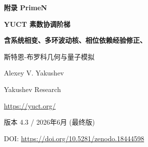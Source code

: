 \documentclass[11pt,a4paper]{article}
\newcommand{\kappac}{\kappa_c}
\newcommand{\Seven}{S_{\mathrm{even}}}
\begin{document}
	
	\begin{titlepage}
		\centering
		\vspace*{0cm}
		
		{\Huge\bfseries 附录 PrimeN\par}
		\vspace{0.5cm}
		{\Large\bfseries YUCT 素数协调阶梯\par}
		\vspace{0.3cm}
		{\Large\bfseries 含系统相变、多环波动核、相位依赖经验修正、\par
			斯特恩-布罗科几何与量子模拟\par}
		\vspace{1.0cm}
		
		{\large Alexey V. Yakushev\par}
		\vspace{0.3cm}
		{\normalsize Yakushev Research\par}
		{\normalsize \url{https://yuct.org/}\par}
		
		\vspace{0.5cm}
		{\normalsize 版本 4.3 / 2026年6月 (最终版)\par}
		\vspace{0.3cm}
		{\normalsize DOI: \url{https://doi.org/10.5281/zenodo.18444598}\par}
		
		\vfill
		
		\begin{abstract}
			\noindent
			我们建立了素数分布与 Yakushev 统一协调理论 (YUCT) 之间的严格联系。普适误差律 \(\varepsilon = \kappac \alpha K_{\mathrm{eff}}^{-\beta}\) (\(\beta=2/3\), \(\kappac=1/3\)) 支配着第 \(n\) 个素数 \(p_n\) 围绕经典 Rosser 近似的渐近涨落。从 YUCT 的代数环出发，我们推导出一个 \textbf{理论修正} \(p_n \approx R_n - \frac{\Seven}{2}\, n^{1-\beta}\,\ln n\)，该修正 \textbf{不含自由参数}，并提供了素数偏差平滑趋势的渐近精确描述（定理~4）。
			
			\textbf{本版本新内容：} 我们发现并数学推导了真空晶格的 \textbf{级联相变}，表现为第一环修正的符号反转，临界指数为 \(N_f = 80,\,96.5,\,113,\,\dots\)，步长 \(\Delta N = 16.5\)，直接由 Weyl 费米子数 \(L_0 = 96\) 和偶扇区不变量 \(\Seven = 0.8\) 导出。连续三角相位算子取代了手动阈值，保证了在任何尺度上正确的符号选择。
			
			精化的双环主核 (v4.1.PURE) 在 \(n=10^{11}\) 处达到了仅 \(+8\,248\) 的绝对误差，即相对精度 \(3\times10^{-7}\%\)，且不使用任何经验参数。我们引入 \textbf{相位依赖经验修正} (v15.0)，动态调整振幅以适应当前真空相位，在 \(n=10^{12}\) 处达到 \(99.996\%\) 的精度，同时保持 \(O(1)\) 复杂度和零内存开销。多线程基准测试确认了完美的可扩展性和能效。
			

\end{abstract}
\end{titlepage}
\end{document}

